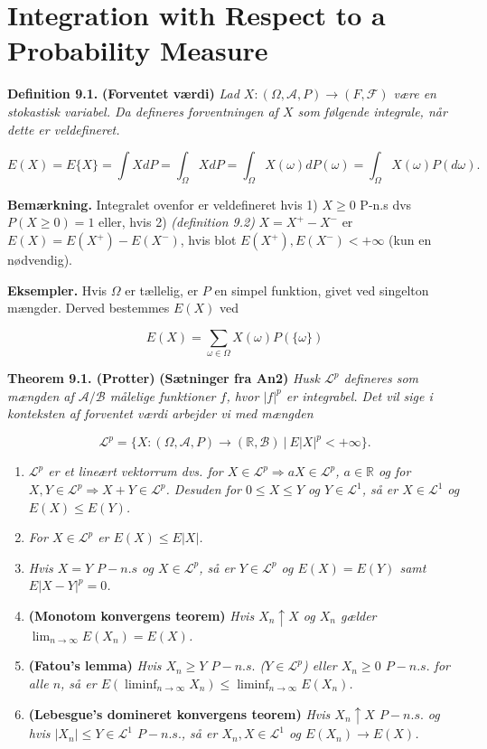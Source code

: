 \documentclass[
]{book}
\providecommand{\tightlist}{%
  \setlength{\itemsep}{0pt}\setlength{\parskip}{0pt}}
\begin{document}
\hypertarget{integration-with-respect-to-a-probability-measure}{%
\section{Integration with Respect to a Probability Measure}\label{integration-with-respect-to-a-probability-measure}}

\textbf{Definition 9.1.} \textbf{(Forventet værdi)} \emph{Lad \(X : (\Omega, \mathcal{A}, P) \to (F,\mathcal{F})\) være en stokastisk variabel. Da defineres forventningen af \(X\) som følgende integrale, når dette er veldefineret.}

\[
E(X)=E\{X\}=\int X dP=\int_\Omega X dP=\int_\Omega X(\omega)dP(\omega)=\int_\Omega X(\omega)P(d\omega).
\]

\textbf{Bemærkning.} Integralet ovenfor er veldefineret hvis 1) \(X\ge 0\) P-n.s dvs \(P(X\ge 0)=1\) eller, hvis 2) \emph{(definition 9.2)} \(X=X^+-X^-\) er \(E(X)=E(X^+)-E(X^-)\), hvis blot \(E(X^+),E(X^-)<+\infty\) (kun en nødvendig).

\textbf{Eksempler.} Hvis \(\Omega\) er tællelig, er \(P\) en simpel funktion, givet ved singelton mængder. Derved bestemmes \(E(X)\) ved

\[
E(X)=\sum_{\omega\in\Omega} X(\omega)P(\{\omega\})
\]

\textbf{Theorem 9.1. (Protter)} \textbf{(Sætninger fra An2)} \emph{Husk \(\mathcal{L}^p\) defineres som mængden af \(\mathcal{A}/\mathcal{B}\) målelige funktioner \(f\), hvor \(\vert f\vert ^p\) er integrabel. Det vil sige i konteksten af forventet værdi arbejder vi med mængden}

\[
\mathcal{L}^p=\{X : (\Omega,\mathcal{A},P)\to(\mathbb{R},\mathcal{B})\ \vert\ E\vert X\vert^p< +\infty\}.
\]

\begin{enumerate}
\def\labelenumi{\alph{enumi}.}
\tightlist
\item
  \emph{\(\mathcal{L}^p\) er et lineært vektorrum dvs. for \(X\in \mathcal{L}^p\Rightarrow aX\in\mathcal{L}^p\), \(a\in\mathbb{R}\) og for \(X,Y\in\mathcal{L}^p\Rightarrow X+Y\in\mathcal{L}^p\). Desuden for \(0\le X\le Y\) og \(Y\in\mathcal{L}^1\), så er \(X\in\mathcal{L}^1\) og \(E(X)\le E(Y)\).}
\item
  \emph{For \(X\in\mathcal{L}^p\) er \(E(X)\le E\vert X\vert\).}
\item
  \emph{Hvis \(X=Y\) \(P-n.s\) og \(X\in\mathcal{L}^p\), så er \(Y\in\mathcal{L}^p\) og \(E(X)=E(Y)\) samt \(E\vert X-Y\vert^p=0\).}
\item
  \textbf{(Monotom konvergens teorem)} \emph{Hvis \(X_n\uparrow X\) og \(X_n\) gælder \(\lim_{n\to \infty} E(X_n)=E(X)\).}
\item
  \textbf{(Fatou's lemma)} \emph{Hvis \(X_n\ge Y\) \(P-n.s.\) (\(Y\in\mathcal{L}^p\)) eller \(X_n\ge 0\) \(P-n.s.\) for alle \(n\), så er \(E(\liminf_{n\to\infty}X_n)\le \liminf_{n\to \infty} E(X_n)\).}
\item
  \textbf{(Lebesgue's domineret konvergens teorem)} \emph{Hvis \(X_n\uparrow X\) \(P-n.s.\) og hvis \(\vert X_n\vert \le Y\in\mathcal{L}^1\) \(P-n.s.\), så er \(X_n,X\in\mathcal{L}^1\) og \(E(X_n)\to E(X)\).}
\end{enumerate}
\end{document}
